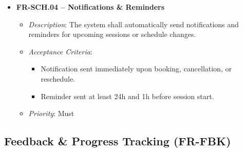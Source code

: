 \begin{itemize}
\item \textbf{FR-SCH.04 – Notifications \& Reminders}
    \begin{itemize}
        \item \textit{Description}: The system shall automatically send notifications and reminders for upcoming sessions or schedule changes.
        \item \textit{Acceptance Criteria}:
            \begin{itemize}
                \item Notification sent immediately upon booking, cancellation, or reschedule.
                \item Reminder sent at least 24h and 1h before session start.
            \end{itemize}  
        \item \textit{Priority}: Must
    \end{itemize}
   

\end{itemize}



\subsection{Feedback \& Progress Tracking (FR-FBK)}

